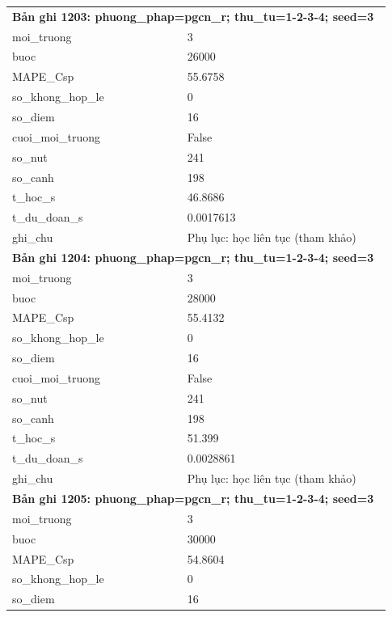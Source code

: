 \begin{longtable}{p{0.43\linewidth}p{0.50\linewidth}}
\midrule
\multicolumn{2}{p{0.95\linewidth}}{\textbf{Bản ghi 1203: phuong\_phap=pgcn\_r; thu\_tu=1-2-3-4; seed=3}} \\
moi\_\allowbreak truong & 3 \\
buoc & 26000 \\
MAPE\_\allowbreak Csp & 55.6758 \\
so\_\allowbreak khong\_\allowbreak hop\_\allowbreak le & 0 \\
so\_\allowbreak diem & 16 \\
cuoi\_\allowbreak moi\_\allowbreak truong & False \\
so\_\allowbreak nut & 241 \\
so\_\allowbreak canh & 198 \\
t\_\allowbreak hoc\_\allowbreak s & 46.8686 \\
t\_\allowbreak du\_\allowbreak doan\_\allowbreak s & 0.0017613 \\
ghi\_\allowbreak chu & Phụ lục: học liên tục (tham khảo) \\
\midrule
\multicolumn{2}{p{0.95\linewidth}}{\textbf{Bản ghi 1204: phuong\_phap=pgcn\_r; thu\_tu=1-2-3-4; seed=3}} \\
moi\_\allowbreak truong & 3 \\
buoc & 28000 \\
MAPE\_\allowbreak Csp & 55.4132 \\
so\_\allowbreak khong\_\allowbreak hop\_\allowbreak le & 0 \\
so\_\allowbreak diem & 16 \\
cuoi\_\allowbreak moi\_\allowbreak truong & False \\
so\_\allowbreak nut & 241 \\
so\_\allowbreak canh & 198 \\
t\_\allowbreak hoc\_\allowbreak s & 51.399 \\
t\_\allowbreak du\_\allowbreak doan\_\allowbreak s & 0.0028861 \\
ghi\_\allowbreak chu & Phụ lục: học liên tục (tham khảo) \\
\midrule
\multicolumn{2}{p{0.95\linewidth}}{\textbf{Bản ghi 1205: phuong\_phap=pgcn\_r; thu\_tu=1-2-3-4; seed=3}} \\
moi\_\allowbreak truong & 3 \\
buoc & 30000 \\
MAPE\_\allowbreak Csp & 54.8604 \\
so\_\allowbreak khong\_\allowbreak hop\_\allowbreak le & 0 \\
so\_\allowbreak diem & 16 \\

\end{longtable}
